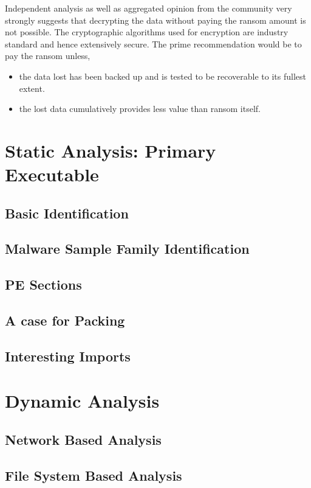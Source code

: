 \documentclass[10pt,a4paper]{article}
\begin{document}
Independent analysis as well as aggregated opinion from the community very strongly suggests that decrypting the data without paying the ransom amount is not possible.
The cryptographic algorithms used for encryption are industry standard and hence extensively secure.
The prime recommendation would be to pay the ransom unless,
\begin{itemize}
	\item the data lost has been backed up and is tested to be recoverable to its fullest extent.
	\item the lost data cumulatively provides less value than ransom itself.
\end{itemize}

\newpage

\section{Static Analysis: Primary Executable}
	\subsection{Basic Identification}
	\subsection{Malware Sample Family Identification}
	\subsection{PE Sections}
	\subsection{A case for Packing}
	\subsection{Interesting Imports}

\section{Dynamic Analysis}
	\subsection{Network Based Analysis}
	\subsection{File System Based Analysis}
\end{document}
